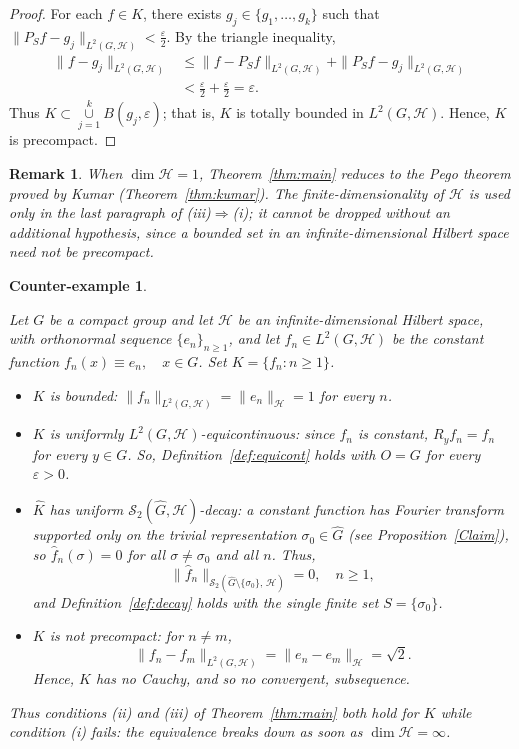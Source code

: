 \documentclass[11pt]{amsart}
\newtheorem{remark}[theorem]{Remark}
\newtheorem{counterexample}[theorem]{Counter-example}
\def\union{\mathop{\cup }}
\begin{document}
\begin{proof}
For each $f\in K$, there exists  $g_j\in \{g_1,\dots,g_k\}$ such that $\|P_Sf-g_j\|_{L^2(G,\mathcal{H})}<\frac{\varepsilon}{2}$. By the
triangle inequality, 
\begin{align*}
\|f-g_j\|_{L^2(G,\mathcal{H})}&\le\|f-P_Sf\|_{L^2(G,\mathcal{H})}+\|P_Sf-g_j\|_{L^2(G,\mathcal{H})}\\
&<\frac{\varepsilon}{2}+\frac{\varepsilon}{2}=\varepsilon.
\end{align*}
Thus $K\subset\union\limits_{j=1}^kB(g_j,\varepsilon)$; that is,  $K$ is totally bounded in
$L^2(G,\mathcal{H})$. Hence, $K$ is precompact.
\end{proof}

\begin{remark}{\rm
When $\dim\mathcal{H}=1$, Theorem~\ref{thm:main} reduces to the Pego theorem proved by  Kumar (Theorem~\ref{thm:kumar}).
The finite-dimensionality of $\mathcal{H}$ is used only in the last paragraph of
(iii)$\Rightarrow$(i); it cannot be dropped without an additional hypothesis, since a
bounded set in an infinite-dimensional Hilbert space need not be precompact.
}\end{remark}



\begin{counterexample}\label{ex:counterexample}{\rm
Let $G$ be a compact group and  let $\mathcal{H}$ be an {\it infinite-dimensional} Hilbert space, with orthonormal sequence
$\{e_n\}_{n\ge1}$, and let $f_n\in L^2(G,\mathcal{H})$ be the constant function
$f_n(x)\equiv e_n,\quad x\in G$. Set $K=\{f_n : n\ge1\}$.

\begin{itemize}
\item $K$ is bounded: $\|f_n\|_{L^2(G,\mathcal{H})}=\|e_n\|_\mathcal{H}=1$ for every $n$.

\item $K$ is uniformly $L^2(G,\mathcal{H})$-equicontinuous: since $f_n$ is
constant, $R_yf_n=f_n$ for every $y\in G$. So,  Definition~\ref{def:equicont} holds with
$O=G$ for every $\varepsilon>0$.

\item $\widehat K$ has uniform $\mathscr{S}_2(\widehat{G},\mathcal{H})$-decay: a constant
function has Fourier transform supported only on the trivial representation
$\sigma_0\in\widehat{G}$ (see Proposition~\ref{Claim}), so $\widehat f_n(\sigma)=0$ for all $\sigma\ne\sigma_0$ and all $n$. Thus, 
$$
\|\widehat f_n\|_{\mathscr{S}_2(\widehat{G}\setminus\{\sigma_0\},\,\mathcal{H})}=0,\quad n\ge1,
$$
and Definition~\ref{def:decay} holds with the single finite set $S=\{\sigma_0\}$.

\item $K$ is not precompact: for $n\ne m$,
$$
\|f_n-f_m\|_{L^2(G,\mathcal{H})}=\|e_n-e_m\|_\mathcal{H}=\sqrt2.
$$
 Hence, $K$ has no Cauchy, and so no convergent, subsequence.
\end{itemize}
\noindent  Thus conditions (ii) and (iii) of Theorem~\ref{thm:main} both hold for $K$ while
condition (i) fails: the equivalence breaks down as soon as $\dim\mathcal{H}=\infty$.
}\end{counterexample}
\end{document}
